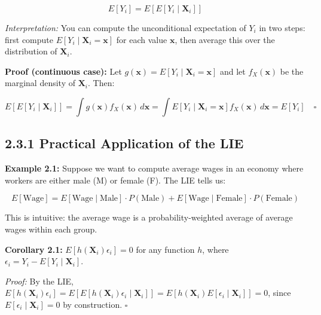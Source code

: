 \[
E[Y_i] = E\left[E[Y_i \mid \mathbf{X}_i]\right]
\]

\textit{Interpretation:} You can compute the unconditional expectation of $Y_i$ in two steps: first compute $E[Y_i \mid \mathbf{X}_i = \mathbf{x}]$ for each value $\mathbf{x}$, then average this over the distribution of $\mathbf{X}_i$.

\textbf{Proof (continuous case):} Let $g(\mathbf{x}) = E[Y_i \mid \mathbf{X}_i = \mathbf{x}]$ and let $f_X(\mathbf{x})$ be the marginal density of $\mathbf{X}_i$. Then:

\[
E\left[E[Y_i \mid \mathbf{X}_i]\right] = \int g(\mathbf{x}) f_X(\mathbf{x})\, d\mathbf{x} = \int E[Y_i \mid \mathbf{X}_i = \mathbf{x}] f_X(\mathbf{x})\, d\mathbf{x} = E[Y_i] \quad \square
\]

\subsection{2.3.1 Practical Application of the LIE}

\textbf{Example 2.1:} Suppose we want to compute average wages in an economy where workers are either male (M) or female (F). The LIE tells us:

\[
E[\text{Wage}] = E[\text{Wage} \mid \text{Male}] \cdot P(\text{Male}) + E[\text{Wage} \mid \text{Female}] \cdot P(\text{Female})
\]

This is intuitive: the average wage is a probability-weighted average of average wages within each group.

\textbf{Corollary 2.1:} $E[h(\mathbf{X}_i) \epsilon_i] = 0$ for any function $h$, where $\epsilon_i = Y_i - E[Y_i \mid \mathbf{X}_i]$.

\textit{Proof:} By the LIE, $E[h(\mathbf{X}_i) \epsilon_i] = E\left[E[h(\mathbf{X}_i) \epsilon_i \mid \mathbf{X}_i]\right] = E\left[h(\mathbf{X}_i) E[\epsilon_i \mid \mathbf{X}_i]\right] = 0$, since $E[\epsilon_i \mid \mathbf{X}_i] = 0$ by construction. $\square$

